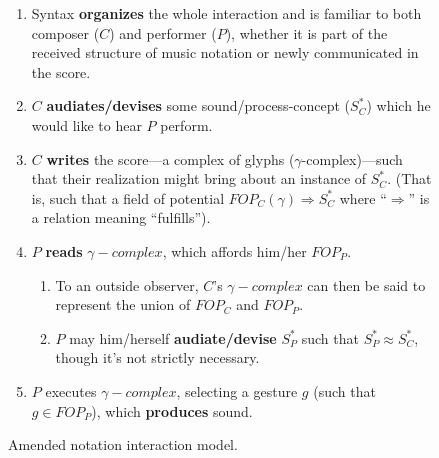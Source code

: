 \begin{figure}
\begin{smallquote}
                    \begin{enumerate}
                        \item Syntax \textbf{organizes} the whole interaction and is familiar to both composer ($C$) and performer ($P$), whether it is part of the received structure of music notation or newly communicated in the score.\footnotemark                            
                        \item $C$ \textbf{audiates/devises} some sound/process-concept ($S^*_C$) which he would like to hear $P$ perform.
                        \item $C$ \textbf{writes} the score---a complex of glyphs ($\gamma$-complex)---such that  their realization might bring about an instance of $S^*_C$. (That is, such that a field of potential $FOP_C(\gamma)\Rightarrow S^*_C$ where ``$\Rightarrow$'' is a relation meaning ``fulfills'').
                        \item $P$ \textbf{reads} $\gamma-complex$, which affords him/her $FOP_P$.
                            \begin{enumerate}
                                \item To an outside observer, $C$'s $\gamma-complex$ can then be said to represent the union of $FOP_C$ and $FOP_P$.
                                \item $P$ may him/herself \textbf{audiate/devise} $S^*_P$ such that $S^*_P \approx S^*_C$, though it's not strictly necessary.
                            \end{enumerate}
                        \item $P$ executes $\gamma-complex$, selecting a gesture $g$ (such that $g \in FOP_P$), which \textbf{produces} sound.
                    \end{enumerate}
                \end{smallquote}

            \captionsetup{width=.5\textwidth}
            \caption{Amended notation interaction model.}
            \label{fig:amendeddiagram}
        \end{figure}
